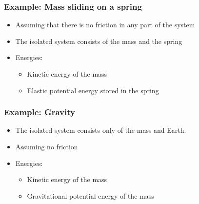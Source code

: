 \documentclass[12pt,compress,aspectratio=169]{beamer}
\newcommand{\mb}[1]{\ensuremath\mathbf{#1}}
\begin{document}
\begin{frame}
  \frametitle{Example: Mass sliding on a spring}

  \begin{itemize}
  \item Assuming that there is no friction in any part of the system
  \item The isolated system consists of the mass and the spring 
  \item Energies:
    \begin{itemize}
    \item Kinetic energy of the mass
    \item Elastic potential energy stored in the spring
    \end{itemize}
  \end{itemize}
  \begin{center}
  \end{center}
\end{frame}


\begin{frame}
  \frametitle{Example: Gravity}

  \begin{center}
  \end{center}
  
  \begin{itemize}
  \item The isolated system consists only of the mass and Earth.
  \item Assuming no friction
  \item Energies:
    \begin{itemize}
    \item Kinetic energy of the mass
    \item Gravitational potential energy of the mass
    \end{itemize}
  \end{itemize}
\end{frame}
\end{document}
